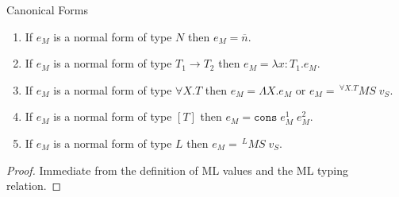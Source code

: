 \begin{mcf}
\label{mcf}
Canonical Forms
\begin{enumerate}
\item If $e_{M}$ is a normal form of type $N$ then $e_{M}=\overline{n}$.
\item If $e_{M}$ is a normal form of type $T_{1}\rightarrow T_{2}$ then $e_{M}=\lambda x:T_{1}.e_{M}$.
\item If $e_{M}$ is a normal form of type $\forall X.T$ then $e_{M}=\Lambda X.e_{M}$ or $e_{M}=\,^{\forall X.T}MS\;v_{S}$.
\item If $e_{M}$ is a normal form of type $[T]$ then $e_{M}=\mathtt{cons}\;e_{M}^{1}\;e_{M}^{2}$.
\item If $e_{M}$ is a normal form of type $L$ then $e_{M}=\,^{L}MS\;v_{S}$.
\end{enumerate}
\begin{proof}
Immediate from the definition of ML values and the ML typing relation.
\end{proof}
\end{mcf}